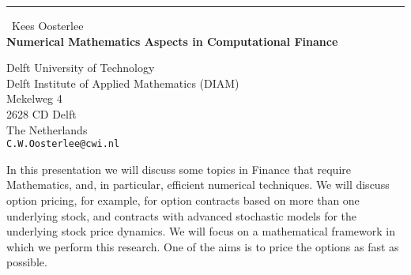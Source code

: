 \documentclass{report}
\begin{document}
\begin{center}
\rule{6in}{1pt} \
{\large Kees Oosterlee \\
{\bf Numerical Mathematics Aspects in Computational Finance}}

Delft University of Technology \\ Delft Institute of Applied Mathematics (DIAM) \\ Mekelweg 4 \\ 2628 CD Delft \\ The Netherlands
\\
{\tt C.W.Oosterlee@cwi.nl}\end{center}

In this presentation we will discuss some topics in Finance that require
Mathematics, and, in particular, efficient numerical techniques.
We will discuss option pricing, for example, for option contracts based on
more than one underlying stock, and contracts with advanced stochastic
models for the underlying stock price dynamics.
We will focus on a mathematical framework in which we perform this research.
One of the aims is to price the options as fast as possible.
\end{document}

